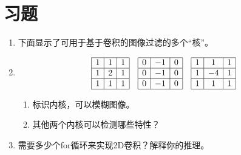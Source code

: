 \section*{习题}\small
\begin{enumerate}

\item 下面显示了可用于基于卷积的图像过滤的多个“核”。
\item  
\begin{equation}
\nonumber
\begin{array}{|c|c|c|}
\hline
1 & 1 & 1\\
\hline
1 & 2 & 1\\
\hline
1 & 1 & 1\\
\hline
\end{array}
\quad
\begin{array}{|c|c|c|}
\hline
0 & -1 & 0\\
\hline
0 & -1 & 0\\
\hline
0 & -1 & 0\\
\hline
\end{array}
\quad
\begin{array}{|c|c|c|}
\hline
1 & 1 & 1\\
\hline
1 & -4 & 1\\
\hline
1 & 1 & 1\\
\hline
\end{array}
\end{equation}

\begin{enumerate}

\item 标识内核，可以模糊图像。
\item 其他两个内核可以检测哪些特性？
\end{enumerate}

\item 需要多少个for循环来实现2D卷积？解释你的推理。
\end{enumerate} \normalsize